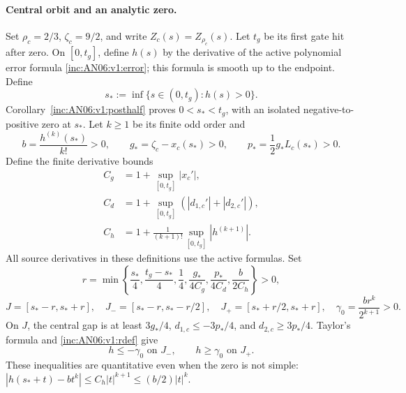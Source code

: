 \documentclass[11pt]{article}
\numberwithin{equation}{section}
\theoremstyle{remark}\newtheorem{remark}[theorem]{Remark}
\newcommand{\1}{\mathbf 1}
\begin{document}
\paragraph{Central orbit and an analytic zero.}
Set $\rho_c=2/3$, $\zeta_c=9/2$, and write
$Z_c(s)=Z_{\rho_c}(s)$. Let $t_g$ be its first gate hit after zero.
On $[0,t_g]$, define $h(s)$ by the derivative of the active polynomial
error formula \eqref{inc:AN06:v1:error}; this formula is smooth up to the
endpoint. Define
\[
 s_*:=\inf\{s\in(0,t_g):h(s)>0\}.
\]
Corollary~\ref{inc:AN06:v1:posthalf} proves $0<s_*<t_g$, with an isolated
negative-to-positive zero at $s_*$. Let $k\ge1$ be its finite odd order and
\[
 b=\frac{h^{(k)}(s_*)}{k!}>0,\qquad
 g_*=\zeta_c-x_c(s_*)>0,\qquad
 p_*=\frac12g_*L_c(s_*)>0.
\]
Define the finite derivative bounds
\begin{align*}
 C_g&=1+\sup_{[0,t_g]}|x_c'|,\\
 C_d&=1+\sup_{[0,t_g]}(|d_{1,c}'|+|d_{2,c}'|),\\
 C_h&=1+\frac1{(k+1)!}\sup_{[0,t_g]}|h^{(k+1)}|.
\end{align*}
All source derivatives in these definitions use the active formulas.
Set
\begin{equation}\label{inc:AN06:v1:rdef}
 r=\min\left\{\frac{s_*}{4},\frac{t_g-s_*}{4},\frac14,
 \frac{g_*}{4C_g},\frac{p_*}{4C_d},\frac b{2C_h}\right\}>0,
\end{equation}
\begin{equation}\label{inc:AN06:v1:windows}
 J=[s_*-r,s_*+r],\quad
 J_-=[s_*-r,s_*-r/2],\quad
 J_+=[s_*+r/2,s_*+r],\quad
 \gamma_0=\frac{br^k}{2^{k+1}}>0.
\end{equation}
On $J$, the central gap is at least $3g_*/4$,
$d_{1,c}\le-3p_*/4$, and $d_{2,c}\ge3p_*/4$.
Taylor's formula and \eqref{inc:AN06:v1:rdef} give
\begin{equation}\label{inc:AN06:v1:centralmargins}
 h\le-\gamma_0\text{ on }J_-,\qquad h\ge\gamma_0\text{ on }J_+.
\end{equation}
These inequalities are quantitative even when the zero is not simple:
$|h(s_*+t)-bt^k|\le C_h|t|^{k+1}\le(b/2)|t|^k$.
\end{document}
